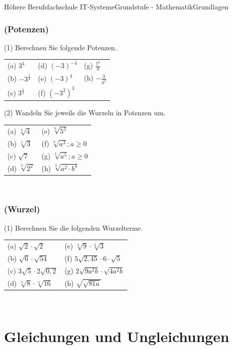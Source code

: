 \documentclass[11pt,twocolumn,oneside,openany,headings=optiontotoc,11pt,numbers=noenddot]{article}
\begin{document}
\begin{worksheet}{Höhere Berufsfachschule IT-Systeme}{Grundstufe - Mathematik}{Grundlagen}
		\subsubsection*{(Potenzen)}
		(1) Berechnen Sie folgende Potenzen.
		\begin{tabularx}{0.5\textwidth}{XXX}
			(a) \(3^4\) & (d) \((-3)^{-4}\) & (g) \(\frac{7^2}{8}\)\\
			(b) \(-3^{\frac{1}{4}}\) & (e) \((-3)^4\) & (h) \(-\frac{3}{4^2}\)\\
			(c) \(3^{\frac{1}{4}}\) & (f) \((-3^2)^3\)
		\end{tabularx}
		\par\bigskip\noindent
		(2) Wandeln Sie jeweils die Wurzeln in Potenzen um.
		\begin{tabularx}{0.5\textwidth}{XX}
			(a) \(\sqrt[3]{4}\) & (e) \(\sqrt[6]{5^3}\)\\
			(b) \(\sqrt[5]{3}\) & (f) \(\sqrt[8]{a^3}; a\geq 0\)\\
			(c) \(\sqrt{7}\) & (g) \(\sqrt[3]{a^5}; a\geq 0\)\\
			(d) \(\sqrt[3]{2^2}\) & (h) \(\sqrt[3]{a^2\cdot{}b^4}\)
		\end{tabularx}\\
		\subsubsection*{(Wurzel)}
		(1) Berechnen Sie die folgenden Wurzelterme.
		\begin{tabularx}{0.5\textwidth}{XX}
			(a) \(\sqrt{2}\cdot\sqrt{2}\) & (e) \(\sqrt[3]{9}\cdot\sqrt[3]{3}\)\\
			(b) \(\sqrt{6}\cdot\sqrt{54}\) & (f) \(5\sqrt{2,45}\cdot{}6\cdot\sqrt{5}\)\\
			(c) \(3\sqrt{5}\cdot{}2\sqrt{0,2}\) & (g) \(2\sqrt{9a^2b}\cdot\sqrt{4a^2b}\)\\
			(d) \(\sqrt[3]{8}\cdot\sqrt[4]{16}\) & (h) \(\sqrt{\sqrt{81a}}\)
		\end{tabularx}\\
		\newpage
		\section{Gleichungen und Ungleichungen}

\end{worksheet}
\end{document}
